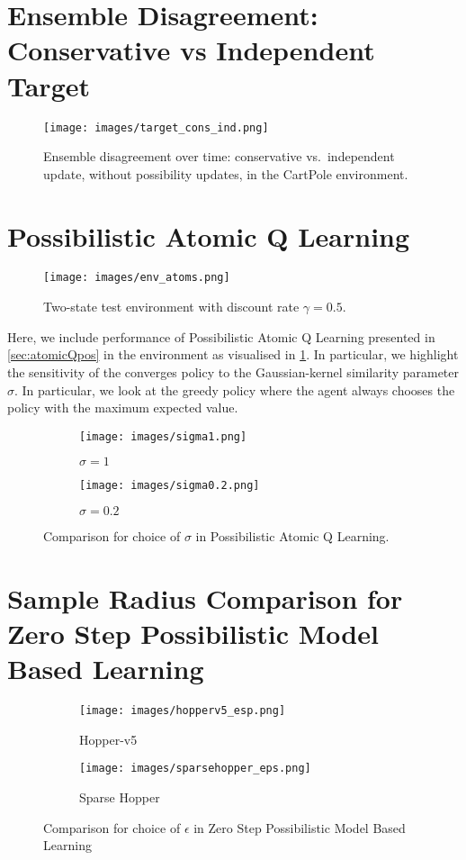 \documentclass[11pt,a4paper]{report}
\begin{document}
\section*{Ensemble Disagreement: Conservative vs Independent Target} \label{appendix:ens-disagre}
\begin{figure}[H]
  \centering
  \texttt{[image: images/target\_cons\_ind.png]}
  \caption{Ensemble disagreement over time: conservative vs.\ independent update, without possibility updates, in the CartPole environment.}
\end{figure}
\section*{Possibilistic Atomic Q Learning} \label{appendix:atomic}

\begin{figure}[H]
  \centering
  \texttt{[image: images/env\_atoms.png]}
  \caption{Two-state test environment with discount rate \(\gamma = 0.5\).}
  \label{fig:testatom}
\end{figure}

Here, we include performance of Possibilistic Atomic Q Learning presented in \ref{sec:atomicQpos} in the environment as visualised in \ref{fig:testatom}. In particular, we highlight the sensitivity of the converges policy to the Gaussian-kernel similarity parameter $\sigma$. In particular, we look at the greedy policy where the agent always chooses the policy with the maximum expected value. 


\begin{figure}[H]
  \centering
  \begin{subfigure}[b]{0.45\textwidth}
    \texttt{[image: images/sigma1.png]}
    \caption{$\sigma = 1$}
  \end{subfigure}
  \hfill
  \begin{subfigure}[b]{0.45\textwidth}
    \texttt{[image: images/sigma0.2.png]}
    \caption{$\sigma = 0.2$}
  \end{subfigure}
  \caption{Comparison for choice of $\sigma$ in Possibilistic Atomic Q Learning.}
\end{figure}
\newpage
\section*{Sample Radius Comparison for Zero Step Possibilistic Model Based Learning}\label{appendix:eps_cmp}

\begin{figure}[H]
  \centering
  \begin{subfigure}[b]{0.45\textwidth}
    \texttt{[image: images/hopperv5\_esp.png]}
    \caption{Hopper-v5}
  \end{subfigure}
  \hfill
  \begin{subfigure}[b]{0.45\textwidth}
    \texttt{[image: images/sparsehopper\_eps.png]}
    \caption{Sparse Hopper}
  \end{subfigure}
  \caption{Comparison for choice of $\epsilon$ in Zero Step Possibilistic Model Based Learning}
\end{figure}
\end{document}
